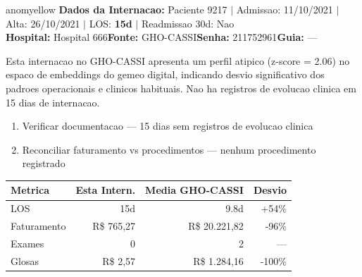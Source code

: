 \documentclass[a4paper,10pt]{article}
\begin{document}
\newpage

\begin{anomalycard}[Internacao 9566 | GHO-CASSI | MODERADO (z=2.06)]{anomyellow}
\textbf{Dados da Internacao:} Paciente 9217 $\mid$ Admissao: 11/10/2021 $\mid$ Alta: 26/10/2021 $\mid$ LOS: \textbf{15d} $\mid$ Readmissao 30d: Nao\\
\textbf{Hospital:} Hospital 666\quad\textbf{Fonte:} GHO-CASSI\quad\textbf{Senha:} 211752961\quad\textbf{Guia:} ---\\
\vspace{2pt}\begin{tcolorbox}[colback=severityred!20,colframe=anomyellow,title={\textbf{Interpretacao de Negocio}},fonttitle=\bfseries\small,left=4pt,right=4pt,top=3pt,bottom=3pt]
{\small Esta internacao no GHO-CASSI apresenta um perfil atipico (z-score = 2.06) no espaco de embeddings do gemeo digital, indicando desvio significativo dos padroes operacionais e clinicos habituais. Nao ha registros de evolucao clinica em 15 dias de internacao.}
\end{tcolorbox}
\begin{tcolorbox}[colback=severityyellow!30,colframe=anomorange,title={\textbf{Recomendacoes Especificas}},fonttitle=\bfseries\small,left=4pt,right=4pt,top=3pt,bottom=3pt]
\begin{enumerate}[nosep,leftmargin=16pt]
\item {\small Verificar documentacao --- 15 dias sem registros de evolucao clinica}
\item {\small Reconciliar faturamento vs procedimentos --- nenhum procedimento registrado}
\end{enumerate}
\end{tcolorbox}
\begin{center}\begin{tabular}{l r r r}\toprule\textbf{Metrica} & \textbf{Esta Intern.} & \textbf{Media GHO-CASSI} & \textbf{Desvio} \\\midrule
LOS & 15d & 9.8d & \textcolor{anomorange}{+54\%} \\
Faturamento & R\$ 765,27 & R\$ 20.221,82 & -96\% \\
Exames & 0 & 2 & --- \\
Glosas & R\$ 2,57 & R\$ 1.284,16 & -100\% \\
\bottomrule\end{tabular}\end{center}


\end{anomalycard}
\end{document}
